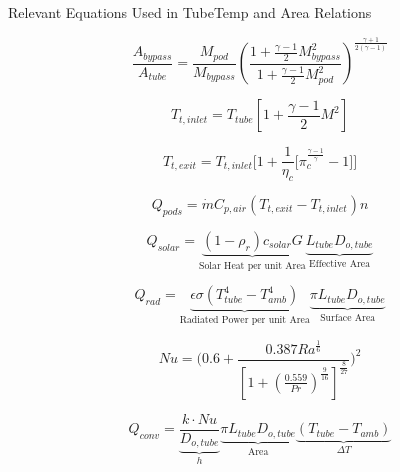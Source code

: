 \documentclass[12]{article}
\begin{document}
\centering
Relevant Equations Used in TubeTemp and Area Relations

\begin{equation}
	\frac{A_{bypass}}{A_{tube}} = \frac{M_{pod}}{M_{bypass}}
	\left(\frac{1+ \frac{\gamma-1}{2} M_{bypass}^2}
	{1+ \frac{\gamma-1}{2} M_{pod}^2}\right)^{\frac{\gamma+1}{2\left(\gamma-1\right)}}
	\label{e:a-over-astar}
\end{equation}

\begin{equation}
	T_{t,inlet} = T_{tube} [1 + \frac{\gamma -1}{2} M^2]
\end{equation}

\begin{equation}
	T_{t,exit} = T_{t,inlet} \Bigg[ 1 + \frac{1}{\eta_{c}} \Big[ \pi_{c}^{\frac{\gamma-1}{\gamma}}- 1 \Big] \Bigg]
\end{equation}

\begin{equation}
	{Q}_{pods}= \dot{m} C_{p,air} (T_{t,exit} - T_{t,inlet}) n
\end{equation}

\begin{equation}
	Q_{solar} = \underbrace{ (1- \rho_{r})  c_{solar}G}_\text{Solar Heat per unit Area} \underbrace{L_{tube}  D_{o,tube}}_\text{Effective Area}
\end{equation}

\begin{equation}
	Q_{rad} = \underbrace{\epsilon \sigma (T_{tube}^4 - T_{amb}^4)}_\text{Radiated Power per unit Area}\underbrace{\pi L_{tube} D_{o,tube}}_\text{Surface Area}
\end{equation}

\begin{equation}
	Nu = \Bigg(0.6 + \frac{0.387Ra^{\frac{1}{6}}}{[1+(\frac{0.559}{Pr})^{\frac{9}{16}}]^{\frac{8}{27}}}\Bigg)^2
\end{equation}

\begin{equation}
	Q_{conv} = \underbrace{ \frac{k\cdot Nu}{ {D}_{o,tube}} }_\text{$h$}
	\underbrace{ \pi {L}_{tube} {D}_{o,tube} }_\text{Area}
	\underbrace{ (T_{tube}-T_{amb})  }_\text{$\Delta T$}
\end{equation}
\end{document}
